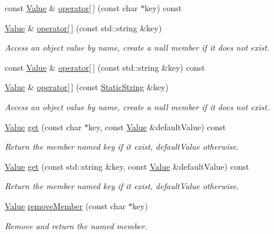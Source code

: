 \begin{DoxyCompactItemize}
const \hyperlink{class_json_1_1_value}{Value} \& \hyperlink{class_json_1_1_value_ae5f73ffc7a039bca81b7ca771bc5db55}{operator\mbox{[}$\,$\mbox{]}} (const char $\ast$key) const 
\item 
\hyperlink{class_json_1_1_value}{Value} \& \hyperlink{class_json_1_1_value_ae511c7d46bf457412fb55c9471af9f50}{operator\mbox{[}$\,$\mbox{]}} (const std\-::string \&key)
\begin{DoxyCompactList}\small\item\em Access an object value by name, create a null member if it does not exist. \end{DoxyCompactList}\item 
const \hyperlink{class_json_1_1_value}{Value} \& \hyperlink{class_json_1_1_value_ac14123afaf12d953aad75ec2610fbb85}{operator\mbox{[}$\,$\mbox{]}} (const std\-::string \&key) const 
\item 
\hyperlink{class_json_1_1_value}{Value} \& \hyperlink{class_json_1_1_value_ac3763d7d315ca65dc188e273722f7955}{operator\mbox{[}$\,$\mbox{]}} (const \hyperlink{class_json_1_1_static_string}{Static\-String} \&key)
\begin{DoxyCompactList}\small\item\em Access an object value by name, create a null member if it does not exist. \end{DoxyCompactList}\item 
\hyperlink{class_json_1_1_value}{Value} \hyperlink{class_json_1_1_value_ab76b3323cde14c7db20676d07b260ce7}{get} (const char $\ast$key, const \hyperlink{class_json_1_1_value}{Value} \&default\-Value) const 
\begin{DoxyCompactList}\small\item\em Return the member named key if it exist, default\-Value otherwise. \end{DoxyCompactList}\item 
\hyperlink{class_json_1_1_value}{Value} \hyperlink{class_json_1_1_value_a54a34264356e01ee9c21a75ccfc809e9}{get} (const std\-::string \&key, const \hyperlink{class_json_1_1_value}{Value} \&default\-Value) const 
\begin{DoxyCompactList}\small\item\em Return the member named key if it exist, default\-Value otherwise. \end{DoxyCompactList}\item 
\hyperlink{class_json_1_1_value}{Value} \hyperlink{class_json_1_1_value_aa52f7873b95d29627d6e83ba96f69aaa}{remove\-Member} (const char $\ast$key)
\begin{DoxyCompactList}\small\item\em Remove and return the named member. \end{DoxyCompactList}\item 

\end{DoxyCompactItemize}
